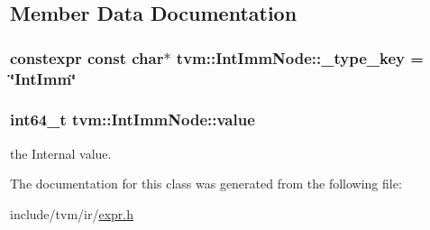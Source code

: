 \subsection{Member Data Documentation}
\subsubsection[{\texorpdfstring{\+\_\+type\+\_\+key}{_type_key}}]{\setlength{\rightskip}{0pt plus 5cm}constexpr const char$\ast$ tvm\+::\+Int\+Imm\+Node\+::\+\_\+type\+\_\+key = \char`\"{}Int\+Imm\char`\"{}\hspace{0.3cm}{\ttfamily [static]}}\hypertarget{classtvm_1_1IntImmNode_a4839f79367838a2baf94f33e6a98f072}{}\label{classtvm_1_1IntImmNode_a4839f79367838a2baf94f33e6a98f072}
\subsubsection[{\texorpdfstring{value}{value}}]{\setlength{\rightskip}{0pt plus 5cm}int64\+\_\+t tvm\+::\+Int\+Imm\+Node\+::value}\hypertarget{classtvm_1_1IntImmNode_a81f4c116ffb5931fdd64639eacad415d}{}\label{classtvm_1_1IntImmNode_a81f4c116ffb5931fdd64639eacad415d}


the Internal value. 



The documentation for this class was generated from the following file\+:\begin{DoxyCompactItemize}
\item 
include/tvm/ir/\hyperlink{ir_2expr_8h}{expr.\+h}\end{DoxyCompactItemize}
